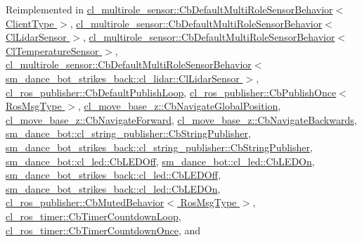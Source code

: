 Reimplemented in \hyperlink{classcl__multirole__sensor_1_1CbDefaultMultiRoleSensorBehavior_a0f400c7e29d0cb1dda11242a5a922f4c}{cl\+\_\+multirole\+\_\+sensor\+::\+Cb\+Default\+Multi\+Role\+Sensor\+Behavior$<$ Client\+Type $>$}, \hyperlink{classcl__multirole__sensor_1_1CbDefaultMultiRoleSensorBehavior_a0f400c7e29d0cb1dda11242a5a922f4c}{cl\+\_\+multirole\+\_\+sensor\+::\+Cb\+Default\+Multi\+Role\+Sensor\+Behavior$<$ Cl\+Lidar\+Sensor $>$}, \hyperlink{classcl__multirole__sensor_1_1CbDefaultMultiRoleSensorBehavior_a0f400c7e29d0cb1dda11242a5a922f4c}{cl\+\_\+multirole\+\_\+sensor\+::\+Cb\+Default\+Multi\+Role\+Sensor\+Behavior$<$ Cl\+Temperature\+Sensor $>$}, \hyperlink{classcl__multirole__sensor_1_1CbDefaultMultiRoleSensorBehavior_a0f400c7e29d0cb1dda11242a5a922f4c}{cl\+\_\+multirole\+\_\+sensor\+::\+Cb\+Default\+Multi\+Role\+Sensor\+Behavior$<$ sm\+\_\+dance\+\_\+bot\+\_\+strikes\+\_\+back\+::cl\+\_\+lidar\+::\+Cl\+Lidar\+Sensor $>$}, \hyperlink{classcl__ros__publisher_1_1CbDefaultPublishLoop_a206c6bc09e7c6414304b679ec415c19f}{cl\+\_\+ros\+\_\+publisher\+::\+Cb\+Default\+Publish\+Loop}, \hyperlink{classcl__ros__publisher_1_1CbPublishOnce_ad82cb7d6ac69fe9b91bc955550ab92cb}{cl\+\_\+ros\+\_\+publisher\+::\+Cb\+Publish\+Once$<$ Ros\+Msg\+Type $>$}, \hyperlink{classcl__move__base__z_1_1CbNavigateGlobalPosition_a5c18268af1e7fc236aa155a58345d5d7}{cl\+\_\+move\+\_\+base\+\_\+z\+::\+Cb\+Navigate\+Global\+Position}, \hyperlink{classcl__move__base__z_1_1CbNavigateForward_a2160484562ef5fb1c655fab7f990241e}{cl\+\_\+move\+\_\+base\+\_\+z\+::\+Cb\+Navigate\+Forward}, \hyperlink{classcl__move__base__z_1_1CbNavigateBackwards_a92858e20e6401051203f5dfa4aef60dc}{cl\+\_\+move\+\_\+base\+\_\+z\+::\+Cb\+Navigate\+Backwards}, \hyperlink{classsm__dance__bot_1_1cl__string__publisher_1_1CbStringPublisher_ac93cc1eb150140331cb3e560ec8249e2}{sm\+\_\+dance\+\_\+bot\+::cl\+\_\+string\+\_\+publisher\+::\+Cb\+String\+Publisher}, \hyperlink{classsm__dance__bot__strikes__back_1_1cl__string__publisher_1_1CbStringPublisher_ae4aa02553119822c583bb2abb44c810c}{sm\+\_\+dance\+\_\+bot\+\_\+strikes\+\_\+back\+::cl\+\_\+string\+\_\+publisher\+::\+Cb\+String\+Publisher}, \hyperlink{classsm__dance__bot_1_1cl__led_1_1CbLEDOff_ad0db28985308dd486943d1f511c655ad}{sm\+\_\+dance\+\_\+bot\+::cl\+\_\+led\+::\+Cb\+L\+E\+D\+Off}, \hyperlink{classsm__dance__bot_1_1cl__led_1_1CbLEDOn_a60a82058c585b4d0398b531c1e1bdf0b}{sm\+\_\+dance\+\_\+bot\+::cl\+\_\+led\+::\+Cb\+L\+E\+D\+On}, \hyperlink{classsm__dance__bot__strikes__back_1_1cl__led_1_1CbLEDOff_a6b4ac6e1c516ced8515e6b6641c5d063}{sm\+\_\+dance\+\_\+bot\+\_\+strikes\+\_\+back\+::cl\+\_\+led\+::\+Cb\+L\+E\+D\+Off}, \hyperlink{classsm__dance__bot__strikes__back_1_1cl__led_1_1CbLEDOn_aadafa99cd7c683a9d1ae59b5158826d9}{sm\+\_\+dance\+\_\+bot\+\_\+strikes\+\_\+back\+::cl\+\_\+led\+::\+Cb\+L\+E\+D\+On}, \hyperlink{classcl__ros__publisher_1_1CbMutedBehavior_a4c02187c58358fa811777d9956510222}{cl\+\_\+ros\+\_\+publisher\+::\+Cb\+Muted\+Behavior$<$ Ros\+Msg\+Type $>$}, \hyperlink{classcl__ros__timer_1_1CbTimerCountdownLoop_a5623e9fdd8f0fb23e8707f7816c099d6}{cl\+\_\+ros\+\_\+timer\+::\+Cb\+Timer\+Countdown\+Loop}, \hyperlink{classcl__ros__timer_1_1CbTimerCountdownOnce_ab602b778a299b42e8cc9f4bf3da0a234}{cl\+\_\+ros\+\_\+timer\+::\+Cb\+Timer\+Countdown\+Once}, and 